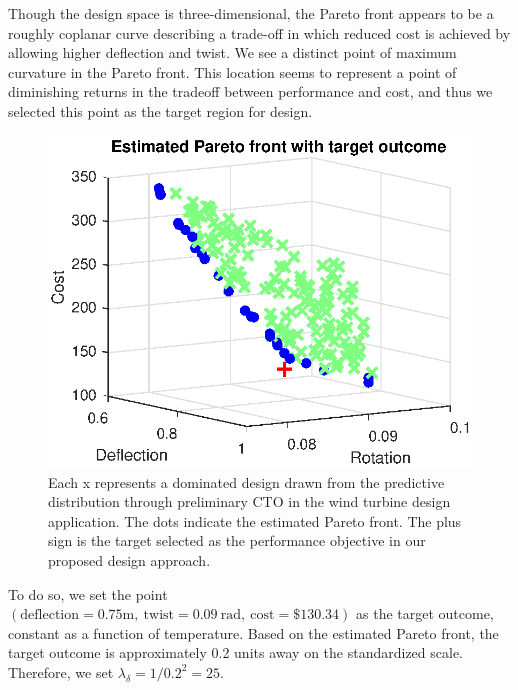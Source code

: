 \documentclass[12pt]{article}
\begin{document}
Though the design space is three-dimensional, the Pareto front appears to be a roughly coplanar curve describing a trade-off in which reduced cost is achieved by allowing higher deflection and twist.
%
We see a distinct point of maximum curvature in the Pareto front. 
%
This location seems to represent a point of diminishing returns in the tradeoff between performance and cost, and thus we selected this point as the target region for design.
%
\begin{figure}
\centering
\includegraphics[scale=0.8]{FIG_est_PF_with_des_obs.eps}
\caption{Each x represents a dominated design drawn from the predictive distribution through preliminary CTO in the wind turbine design application. The dots indicate the estimated Pareto front. The plus sign is the target selected as the performance objective in our proposed design approach.}
\label{fig:elbow}
\end{figure}
%
To do so, we set the point $(\mathrm{deflection}=0.75\mathrm m,\ 
\mathrm{twist}=0.09\ \mathrm{rad},\ 
\mathrm{cost}=\$130.34)$
 as the target outcome, constant as a function of temperature.
%
Based on the estimated Pareto front, the target outcome is approximately 0.2 units away on the standardized scale.
%
Therefore, we set $\lambda_\delta=1/0.2^2=25.$
%
\end{document}
